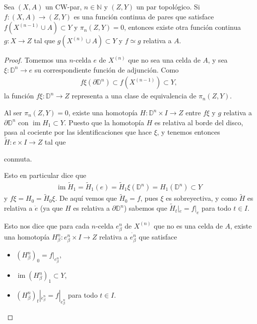 \documentclass[11pt]{article}
\newcommand{\N}{\mathbb{N}}
\newcommand{\D}{\mathbb{D}}
\newcommand{\im}{\operatorname{im}}
\newcommand{\paint}[1]{\color{color}{#1}}
\newenvironment{lemma}[2][Lema]{\begin{trivlist}
\item[\hskip \labelsep \paint{{\bfseries #1}}\hskip \labelsep {\bfseries #2.}]}{\end{trivlist}}
\begin{document}
\begin{lemma}{1} Sea $(X,A)$ un CW-par, $n \in \N$ y $(Z,Y)$ un par topológico. Si $f : (X,A) \to (Z,Y)$ es una función continua de pares que satisface $f(X^{(n-1)} \cup A) \subset Y$ y $\pi_n(Z,Y) = 0$, entonces existe otra función continua $g : X \to Z$ tal que $g(X^{(n)} \cup A) \subset Y$ y $f \simeq g$ relativa a $A$.
\end{lemma}
\begin{proof} Tomemos una $n$-celda $e$ de $X^{(n)}$ que no sea una celda de $A$, y sea $\xi : \D^n \to e$ su correspondiente función de adjunción. Como 
\begin{align*}
f\xi(\partial \D^n) \subset f(X^{(n-1)}) \subset Y,
\end{align*}
la función $f\xi : \D^n \to Z$ representa a una clase de equivalencia de $\pi_n(Z,Y)$. 

Al ser $\pi_n(Z,Y) = 0$, existe una homotopía $H : \D^n \times I \to Z$ entre $f\xi$ y $g$ relativa  a $\partial \D^n$ con $\im H_1 \subset Y$. Puesto que la homotopía $H$ es relativa al borde del disco, pasa al cociente por las identificaciones que hace $\xi$, y tenemos entonces $\tilde{H} : e \times I \to Z$ tal que
\begin{center}
\end{center}
conmuta.

Esto en particular dice que 
\begin{align}
\im \tilde{H}_1 = \tilde{H}_1(e) = \tilde{H}_1\xi(\D^n) = H_1(\D^n) \subset Y
\end{align} 
y $f\xi = H_0 = \tilde{H}_0\xi$. De aquí vemos que $\tilde{H}_0 = f$, pues $\xi$ es sobreyectiva, y como $\tilde{H}$ es relativa a $\dot{e}$ (ya que $H$ es relativa a $\partial \D^n$) sabemos que $\tilde{H}_t|_{\dot{e}} = f|_{\dot{e}}$ para todo $t \in I$. 

Esto nos dice que para cada $n$-celda $e^n_\beta$ de $X^{(n)}$ que no es una celda de $A$, existe una homotopía $H_\beta^n : e^n_\beta \times I \to Z$ relativa a $\dot{e^n_\beta}$ que satisface
\begin{itemize}
\item $(H_\beta^n)_0 = f|_{e_\beta^n}$,
\item $\im (H_\beta^n)_1 \subset Y$,
\item $(H_\beta^n)_t|_{\dot{e}_\beta^n} = f|_{\dot{e}_\beta^n}$ para todo $t \in I$.
\end{itemize} 


\end{proof}
\end{document}
